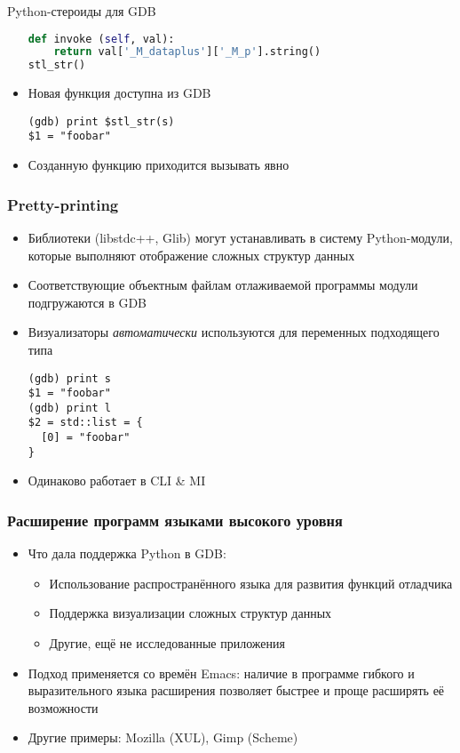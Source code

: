 \documentclass[onlymath]{beamer}
\begin{document}
\begin{subsection}{Python-стероиды для GDB}
\begin{frame}[fragile]
\begin{itemize}
\begin{lstlisting}[language=Python]
  def invoke (self, val):
    return val['_M_dataplus']['_M_p'].string()
stl_str()
\end{lstlisting}
  \item Новая функция доступна из GDB
\begin{lstlisting}[language=gdb,frameround=tttt]
(gdb) print $stl_str(s)
$1 = "foobar"
\end{lstlisting}
  \item Созданную функцию приходится вызывать явно
  \end{itemize}
\end{frame}  

\begin{frame}[fragile]
  \frametitle{Pretty-printing}
  \begin{itemize}
  \item Библиотеки (libstdc++, Glib) могут устанавливать в систему
    Python-модули, которые выполняют отображение сложных структур
    данных
  \item Соответствующие объектным файлам отлаживаемой программы модули
    подгружаются в GDB
  \item Визуализаторы \emph{автоматически} используются для переменных
    подходящего типа
\begin{lstlisting}[language=gdb,frameround=tttt]
(gdb) print s
$1 = "foobar"
(gdb) print l
$2 = std::list = {
  [0] = "foobar"
}
\end{lstlisting}
  \item Одинаково работает в CLI \& MI
  \end{itemize}
\end{frame}
\end{subsection}

\begin{frame}
  \frametitle{Расширение программ языками высокого уровня}
  \begin{itemize}
  \item Что дала поддержка Python в GDB:
    \begin{itemize}
    \item Использование распространённого языка для развития функций
      отладчика
    \item Поддержка визуализации сложных структур данных
    \item Другие, ещё не исследованные приложения
    \end{itemize}
  \item Подход применяется со времён Emacs: наличие в программе
    гибкого и выразительного языка расширения позволяет быстрее и
    проще расширять её возможности
  \item Другие примеры: Mozilla (XUL), Gimp (Scheme)
  \end{itemize}
\end{frame}
\end{document}

